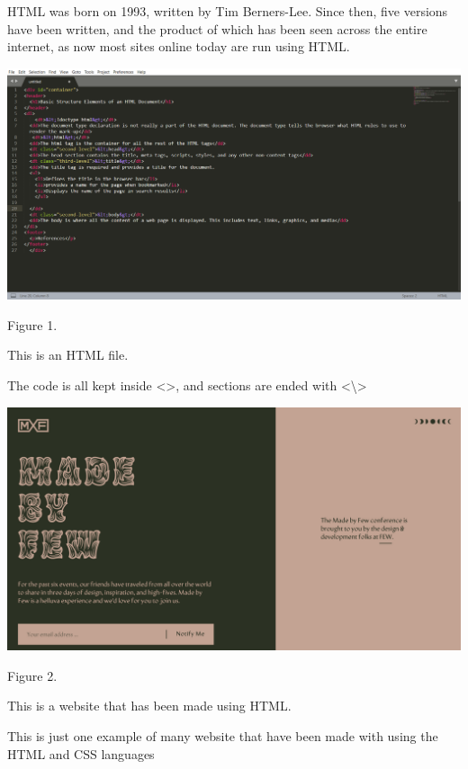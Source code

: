\documentclass{article}
\begin{document}
HTML was born on 1993, written by Tim Berners-Lee. Since then, five versions have been written, and the product of which has been seen across the entire internet, as now most sites online today are run using HTML.



\break

\begin{center}
\includegraphics[scale=0.3]{code}

\hfill

Figure 1. 

This is an HTML file.  

The code is all kept inside \textless \textgreater , and sections are ended with \textless \textbackslash \textgreater

\hfill

\hfill

\includegraphics[scale=0.2]{eg}

\hfill

Figure 2. 

This is a website that has been made using HTML.  

This is just one example of many website that have been made with using the HTML and CSS languages
\end{center}
\end{document}
